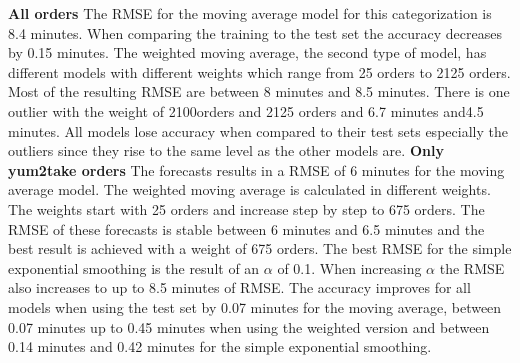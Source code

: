 \newline\textbf{All orders}\newline
The RMSE for the moving average model for this categorization is 8.4 minutes. When comparing the training to the test set the accuracy decreases by 0.15 minutes. The weighted moving average, the second type of model, has different models with different weights which range from 25 orders to 2125 orders. Most of the resulting RMSE are between 8 minutes and 8.5 minutes. There is one outlier with the weight of 2100orders and 2125 orders and 6.7 minutes and4.5 minutes. All models lose accuracy when compared to their test sets especially the outliers since they rise to the same level as the other models are.
\newline\newline\textbf{Only yum2take orders}\newline
The forecasts results in a RMSE of 6 minutes for the moving average model. The weighted moving average is calculated in different weights. The weights start with 25 orders and increase step by step to 675 orders. The RMSE of these forecasts is stable between 6 minutes and 6.5 minutes and the best result is achieved with a weight of 675 orders. The best RMSE for the simple exponential smoothing is the result of an $\alpha$ of 0.1. When increasing $\alpha$ the RMSE also increases to up to 8.5 minutes of RMSE. The accuracy improves for all models when using the test set by 0.07 minutes for the moving average, between 0.07 minutes up to 0.45 minutes when using the weighted version and between 0.14 minutes and 0.42 minutes for the simple exponential smoothing.
